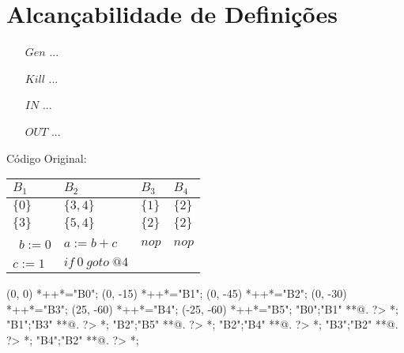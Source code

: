 \section{Alcan\c{c}abilidade de Defini\c{c}\~oes}

\begin{itemize}
  \item[$Gen$] ...
  \item[$Kill$] ...
  \item[$IN$] ...
  \item[$OUT$] ...
\end{itemize}

C\'odigo Original:

\begin{table}[ht]
\begin{scriptsize}
\begin{tabular}{l|l|l|l}
$B_{1}$ & $B_{2}$ & $B_{3}$ & $B_{4}$ \\
\hline
$\{0\}$ & $\{3, 4\}$ & $\{1\}$ & $\{2\}$ \\
$\{3\}$ & $\{5, 4\}$ & $\{2\}$ & $\{2\}$ \\
\hline\
$b:=0$ & $a:=b+c$ & $nop$ & $nop$ \\
$c:=1$ & $if\:0\:goto\:@4$ &  &  \\
\end{tabular}
\end{scriptsize}
\end{table}

\begin{scriptsize}
\xy(0, 0)
	*++{}*\frm{-,}="B0";
(0, -15)
	*++{}*\frm{-,}="B1";
(0, -45)
	*++{}*\frm{-,}="B2";
(0, -30)
	*++{}*\frm{-,}="B3";
(25, -60)
	*++{}*\frm{-,}="B4";
(-25, -60)
	*++{}*\frm{-,}="B5";
"B0";"B1" **@{.} ?> *{\dir{>}};
"B1";"B3" **@{.} ?> *{\dir{>}};
"B2";"B5" **@{.} ?> *{\dir{>}};
"B2";"B4" **@{.} ?> *{\dir{>}};
"B3";"B2" **@{.} ?> *{\dir{>}};
"B4";"B2" **@{.} ?> *{\dir{>}};
\endxy
\end{scriptsize}


